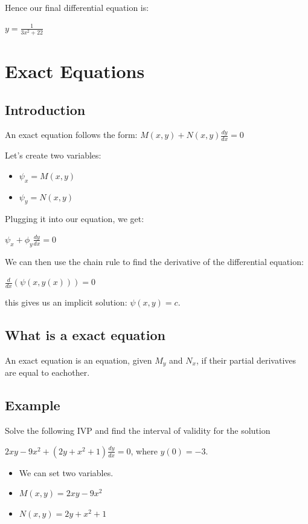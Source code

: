 \documentclass{article}
\begin{document}
Hence our final differential equation is:

\begin{center}
    $y = \frac{1}{3x^2 + 22}$
\end{center}


\section{Exact Equations}
\subsection{Introduction}
An exact equation follows the form: $M(x,y) + N(x,y) \frac{dy}{dx} = 0$

Let's create two variables:

\begin{itemize}
    \item $\psi_x = M(x,y)$
    \item $\psi_y = N(x,y)$
\end{itemize}

Plugging it into our equation, we get:

\begin{center}
$\psi_x + \phi_y \frac{dy}{dx} = 0$
\end{center}

We can then use the chain rule to find the derivative of the differential equation:

\begin{center}
    $\frac{d}{dx} (\psi (x,y(x))) = 0$
\end{center}
this gives us an implicit solution: $\psi(x,y) = c$.

\subsection{What is a exact equation}

An exact equation is an equation, given $M_y$ and $N_x$, if their partial derivatives are equal to eachother.

\subsection{Example}

Solve the following IVP and find the interval of validity for the solution

$2xy - 9x^2 + (2y + x^2 + 1)\frac{dy}{dx} = 0$, where $y(0) = -3$.

\begin{itemize}
    \item We can set two variables.
    \item $M(x,y) = 2xy - 9x^2$
    \item $N(x,y) = 2y + x^2 + 1$
\end{itemize}
\end{document}
